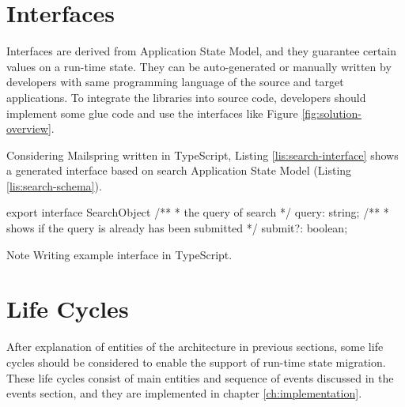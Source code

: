 \section{Interfaces}
Interfaces are derived from Application State Model, and they guarantee certain values on a run-time state. They can be auto-generated or manually written by developers with same programming language of the source and target applications.
To integrate the libraries into source code, developers should implement some glue code and use the interfaces like Figure \ref{fig:solution-overview}.

Considering Mailspring written in TypeScript, Listing \ref{lis:search-interface} shows a generated interface based on search Application State Model (Listing \ref{lis:search-schema}).

\FloatBarrier
\begin{code}
\begin{js}
export interface SearchObject {
    /**
     * the query of search
     */
    query: string;
    /**
     * shows if the query is already has been submitted
     */
    submit?: boolean;
}
\end{js}
\caption{Note Writing example interface in TypeScript.}
\label{lis:search-interface}
\end{code}
\FloatBarrier


\section{Life Cycles}
After explanation of entities of the architecture in previous sections, some life cycles should be considered to enable the support of run-time state migration. These life cycles consist of main entities and sequence of events discussed in the events section, and they are implemented in chapter \ref{ch:implementation}. 

